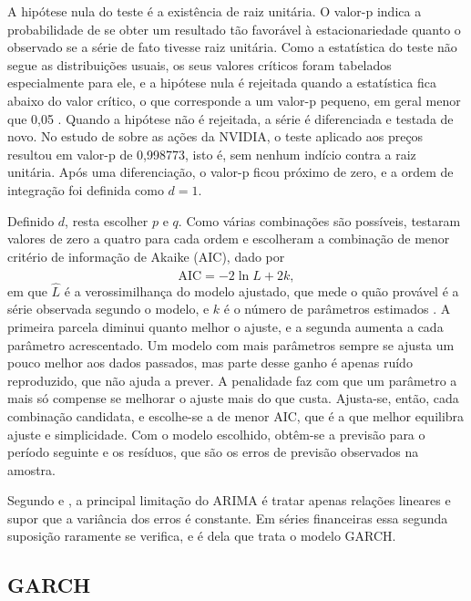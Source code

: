 A hipótese nula do teste é a existência de raiz unitária. O valor-p indica a
probabilidade de se obter um resultado tão favorável à estacionariedade quanto o
observado se a série de fato tivesse raiz unitária. Como a estatística do teste não
segue as distribuições usuais, os seus valores críticos foram tabelados
especialmente para ele, e a hipótese nula é rejeitada quando a estatística fica
abaixo do valor crítico, o que corresponde a um valor-p pequeno, em geral menor
que 0,05 \cite{thomaz2019}. Quando a hipótese não é rejeitada, a série é
diferenciada e testada de novo. No estudo de  sobre as ações
da NVIDIA, o teste aplicado aos preços resultou em valor-p de 0,998773, isto é, sem
nenhum indício contra a raiz unitária. Após uma diferenciação, o valor-p ficou
próximo de zero, e a ordem de integração foi definida como $d = 1$.

Definido $d$, resta escolher $p$ e $q$. Como várias combinações são possíveis,
 testaram valores de zero a quatro para cada ordem e
escolheram a combinação de menor critério de informação de Akaike (AIC), dado por
\begin{equation*}
\text{AIC} = -2\ln \hat{L} + 2k,
\end{equation*}
em que $\hat{L}$ é a verossimilhança do modelo ajustado, que mede o quão provável é
a série observada segundo o modelo, e $k$ é o número de parâmetros estimados
\cite{thomaz2019}. A primeira parcela diminui quanto melhor o ajuste, e a segunda
aumenta a cada parâmetro acrescentado. Um modelo com mais parâmetros sempre se
ajusta um pouco melhor aos dados passados, mas parte desse ganho é apenas ruído
reproduzido, que não ajuda a prever. A penalidade faz com que um parâmetro a mais
só compense se melhorar o ajuste mais do que custa. Ajusta-se, então, cada
combinação candidata, e escolhe-se a de menor AIC, que é a que melhor equilibra
ajuste e simplicidade. Com o modelo escolhido, obtêm-se a previsão para o período
seguinte e os resíduos, que são os erros de previsão observados na amostra.

Segundo  e , a principal limitação do
ARIMA é tratar apenas relações lineares e supor que a variância dos erros é
constante. Em séries financeiras essa segunda suposição raramente se verifica, e é
dela que trata o modelo GARCH.

\subsection{GARCH}
\label{sec:garch}


